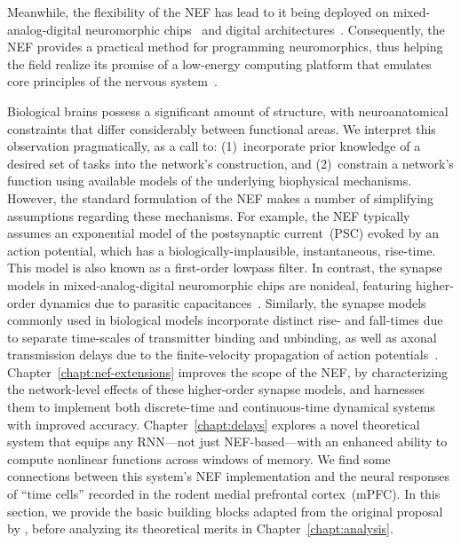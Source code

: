 Meanwhile, the flexibility of the NEF has lead to it being deployed on mixed-analog-digital neuromorphic chips~\citep{choudhary2012silicon, corradi2014, voelker2017iscas, voelker2017neuromorphic, braindrop2019} and digital architectures~\citep{bekolay2014, wang2014compact, mundy2015, knight2016, berzish2016, wang2017neuromorphic, blouw2018a, fischl2018}.
Consequently, the NEF provides a practical method for programming neuromorphics, thus helping the field realize its promise of a low-energy computing platform that emulates core principles of the nervous system~\citep{boahen2017neuromorph}.

Biological brains possess a significant amount of structure, with neuroanatomical constraints that differ considerably between functional areas. %
We interpret this observation pragmatically, as a call to: (1)~incorporate prior knowledge of a desired set of tasks into the network's construction, and (2)~constrain a network's function using available models of the underlying biophysical mechanisms.
However, the standard formulation of the NEF makes a number of simplifying assumptions regarding these mechanisms.
For example, the NEF typically assumes an exponential model of the postsynaptic current~(PSC) evoked by an action potential, which has a biologically-implausible, instantaneous, rise-time.
This model is also known as a first-order lowpass filter.
In contrast, the synapse models in mixed-analog-digital neuromorphic chips are nonideal, featuring higher-order dynamics due to parasitic capacitances~\citep{voelker2017iscas}.
Similarly, the synapse models commonly used in biological models incorporate distinct rise- and fall-times due to separate time-scales of transmitter binding and unbinding, as well as axonal transmission delays due to the finite-velocity propagation of action potentials~\citep{roth2009modeling}.
Chapter~\ref{chapt:nef-extensions} improves the scope of the NEF, by characterizing the network-level effects of these higher-order synapse models, and harnesses them to implement both discrete-time and continuous-time dynamical systems with improved accuracy.
Chapter~\ref{chapt:delays} explores a novel theoretical system that equips any RNN---not just NEF-based---with an enhanced ability to compute nonlinear functions across windows of memory.
We find some connections between this system's NEF implementation and the neural responses of ``time cells'' recorded in the rodent medial prefrontal cortex~(mPFC).
In this section, we provide the basic building blocks adapted from the original proposal by \citet{eliasmith2003a}, before analyzing its theoretical merits in Chapter~\ref{chapt:analysis}.

